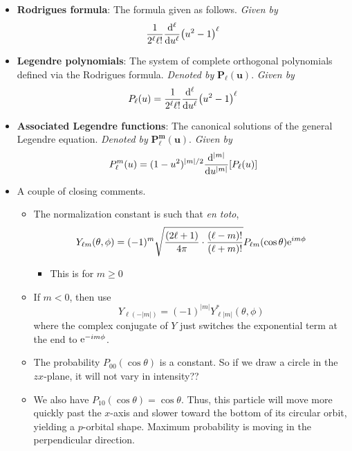 \documentclass[../notes.tex]{subfiles}
\begin{document}
\begin{itemize}
\begin{itemize}
    \end{itemize}
    \item \textbf{Rodrigues formula}: The formula given as follows. \emph{Given by}
    \begin{equation*}
        \frac{1}{2^\ell\ell!}\dv[\ell]{u}(u^2-1)^\ell
    \end{equation*}
    \item \textbf{Legendre polynomials}: The system of complete orthogonal polynomials defined via the Rodrigues formula. \emph{Denoted by} $\bm{P_\ell(u)}$. \emph{Given by}
    \begin{equation*}
        P_\ell(u) = \frac{1}{2^\ell\ell!}\dv[\ell]{u}(u^2-1)^\ell
    \end{equation*}
    \item \textbf{Associated Legendre functions}: The canonical solutions of the general Legendre equation. \emph{Denoted by} $\bm{P_\ell^m(u)}$. \emph{Given by}
    \begin{equation*}
        P_\ell^m(u) = (1-u^2)^{|m|/2}\dv[|m|]{u}[P_\ell(u)]
    \end{equation*}
    \item A couple of closing comments.
    \begin{itemize}
        \item The normalization constant is such that \emph{en toto},
        \begin{equation*}
            Y_{\ell m}(\theta,\phi) = (-1)^m\sqrt{\frac{(2\ell+1)}{4\pi}\cdot\frac{(\ell-m)!}{(\ell+m)!}}P_{\ell m}(\cos\theta)\e[im\phi]
        \end{equation*}
        \begin{itemize}
            \item This is for $m\geq 0$
        \end{itemize}
        \item If $m<0$, then use
        \begin{equation*}
            Y_{\ell(-|m|)} = (-1)^{|m|}Y_{\ell|m|}^*(\theta,\phi)
        \end{equation*}
        where the complex conjugate of $Y$ just switches the exponential term at the end to $\e[-im\phi]$.
        \item The probability $P_{00}(\cos\theta)$ is a constant. So if we draw a circle in the $zx$-plane, it will not vary in intensity??
        \item We also have $P_{10}(\cos\theta)=\cos\theta$. Thus, this particle will move more quickly past the $x$-axis and slower toward the bottom of its circular orbit, yielding a $p$-orbital shape. Maximum probability is moving in the perpendicular direction.

\end{itemize}
\end{itemize}
\end{document}

